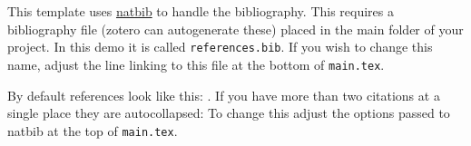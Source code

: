 This template uses \href{https://da.overleaf.com/learn/latex/Bibliography_management_with_natbib}{natbib} to handle the bibliography. This requires a bibliography file (zotero can autogenerate these) placed in the main folder of your project. In this demo it is called \texttt{references.bib}. If you wish to change this name, adjust the line linking to this file at the bottom of \texttt{main.tex}. 

By default references look like this: \cite{mullainathan_machine_2017}. If you have more than two citations at a single place they are autocollapsed: \cite{shalit_estimating_2016,brunicardi_overview_2011,ginsburg_precision_2018}
 To change this adjust the options passed to natbib at the top of \texttt{main.tex}.
